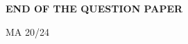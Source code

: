 \documentclass{article}
\begin{document}
																																																																																																																																									       \vspace{5em}
																																																																																																																																									       \begin{center}
																																																																																																																																									           \textbf{END OF THE QUESTION PAPER}
																																																																																																																																										   \end{center}
																																																																																																																																										   \vspace{15em}
																																																																																																																																										   \begin{center}
																																																																																																																																										       {MA 20/24}
																																																																																																																																										       \end{center}

																																																																																																																																										       
\end{document}
